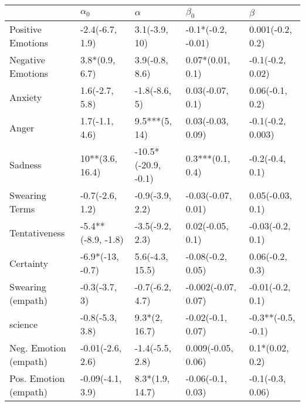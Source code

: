 \begin{tabular}{lllll}
\toprule
{} &          $\alpha_0$ &             $\alpha$ &            $\beta_0$ &             $\beta$ \\
\midrule
Positive Emotions     &     -2.4(-6.7, 1.9) &        3.1(-3.9, 10) &   -0.1*(-0.2, -0.01) &    0.001(-0.2, 0.2) \\
Negative Emotions     &      3.8*(0.9, 6.7) &       3.9(-0.8, 8.6) &     0.07*(0.01, 0.1) &    -0.1(-0.2, 0.02) \\
Anxiety               &      1.6(-2.7, 5.8) &        -1.8(-8.6, 5) &     0.03(-0.07, 0.1) &     0.06(-0.1, 0.2) \\
Anger                 &      1.7(-1.1, 4.6) &        9.5***(5, 14) &    0.03(-0.03, 0.09) &   -0.1(-0.2, 0.003) \\
Sadness               &     10**(3.6, 16.4) &  -10.5*(-20.9, -0.1) &     0.3***(0.1, 0.4) &     -0.2(-0.4, 0.1) \\
Swearing Terms        &     -0.7(-2.6, 1.2) &      -0.9(-3.9, 2.2) &   -0.03(-0.07, 0.01) &    0.05(-0.03, 0.1) \\
Tentativeness         &  -5.4**(-8.9, -1.8) &      -3.5(-9.2, 2.3) &     0.02(-0.05, 0.1) &    -0.03(-0.2, 0.1) \\
Certainty             &    -6.9*(-13, -0.7) &      5.6(-4.3, 15.5) &    -0.08(-0.2, 0.05) &     0.06(-0.2, 0.3) \\
Swearing (empath)     &       -0.3(-3.7, 3) &      -0.7(-6.2, 4.7) &  -0.002(-0.07, 0.07) &    -0.01(-0.2, 0.1) \\
science               &     -0.8(-5.3, 3.8) &        9.3*(2, 16.7) &    -0.02(-0.1, 0.07) &  -0.3**(-0.5, -0.1) \\
Neg. Emotion (empath) &    -0.01(-2.6, 2.6) &      -1.4(-5.5, 2.8) &   0.009(-0.05, 0.06) &     0.1*(0.02, 0.2) \\
Pos. Emotion (empath) &    -0.09(-4.1, 3.9) &      8.3*(1.9, 14.7) &    -0.06(-0.1, 0.03) &    -0.1(-0.3, 0.06) \\
\bottomrule
\end{tabular}
